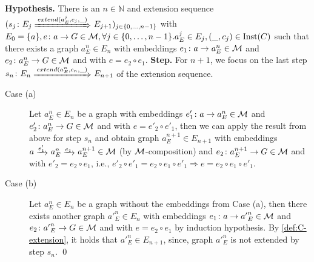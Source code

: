 \textbf{Hypothesis.} There is an $n \in \mathbb{N}$ and extension sequence $(s_j\colon E_j \Trans{extend(a_E^j,c_j,\_)} E_{j+1})_{j \in \{0,\ldots,n-1\}}$ with $E_0=\{a\}, e\colon a \to G \in {\cal M}, \forall j \in \{0,\ldots,n-1\}.a_E^j \in E_j,(\_,c_j) \in \mathrm{Inst}(C)$ such that there exists a graph $a_E^n \in E_n$ with embeddings $e_1\colon a \to a_E^n \in {\cal M}$ and $e_2\colon a_E^n \to G \in {\cal M}$ and with $e=e_2 \circ e_1$.
\textbf{Step.} For $n+1$, we focus on the last step $s_n\colon E_n \Trans{extend(a_E^n,c_n,\_)} E_{n+1}$ of the extension sequence.
\begin{description}
\item[Case (a)] Let $a_E^n \in E_n$ be a graph with embeddings $e'_1\colon a \to a_E^n \in {\cal M}$ and $e'_2\colon a_E^n \to G \in {\cal M}$ and with $e=e'_2 \circ e'_1$, then we can apply the result from above for step $s_n$ and obtain graph $a_E^{n+1} \in E_{n+1}$ with embeddings $a \trans{e'_1} a_E^n \trans{e_1} a_E^{n+1} \in \M$ (by ${\cal M}$-composition) and $e_2\colon a_E^{n+1} \to G \in {\cal M}$ and with $e'_2=e_2 \circ e_1$, i.e., $e'_2 \circ e'_1=e_2 \circ e_1 \circ e'_1 \Rightarrow e=e_2 \circ e_1 \circ e'_1$. 
\item[Case (b)] Let $a_E^n \in E_n$ be a graph without the embeddings from Case (a), then there exists another graph ${a'}_E^n \in E_n$ with embeddings $e_1\colon a \to {a'}_E^n \in {\cal M}$ and $e_2\colon {a'}_E^n \to G \in {\cal M}$ and with $e=e_2 \circ e_1$ by induction hypothesis.
By \cref{def:C-extension}, it holds that ${a'}_E^n \in E_{n+1}$, since, graph ${a'}_E^n$ is not extended by step $s_n$.
\qed
\end{description}

